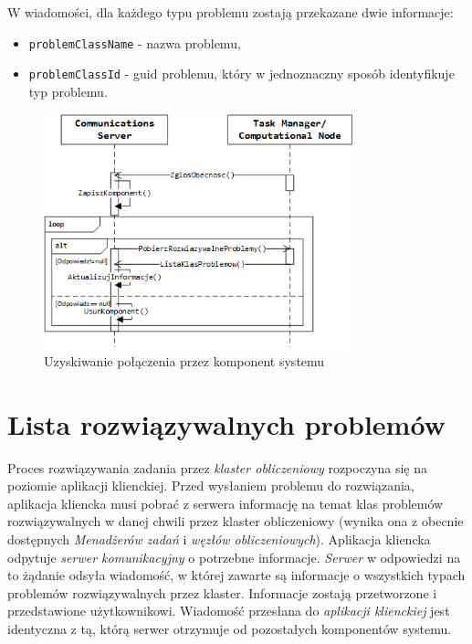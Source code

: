 \documentclass[12pt,a4paper,titlepage]{report}
\begin{document}
	W wiadomości, dla każdego typu problemu zostają przekazane dwie informacje:
	\begin{itemize}
		\item \verb+problemClassName+ - nazwa problemu,
		\item \verb+problemClassId+ - guid problemu, który w jednoznaczny sposób identyfikuje typ problemu.	
	\end{itemize} 		
		
	\begin{figure}[h]
		\centering
		\caption{Uzyskiwanie połączenia przez komponent systemu}
		\includegraphics[width=0.8\textwidth]{img/communication/connecting.png}
	\end{figure}
	
	\section{Lista rozwiązywalnych problemów}
	Proces rozwiązywania zadania przez \textit{klaster obliczeniowy} rozpoczyna się na poziomie aplikacji klienckiej. Przed
	wysłaniem problemu do rozwiązania, aplikacja kliencka musi pobrać z serwera informację na temat klas problemów
	rozwiązywalnych w danej chwili przez klaster obliczeniowy (wynika ona z obecnie dostępnych \textit{Menadżerów zadań} i
	\textit{węzłów obliczeniowych}). Aplikacja kliencka odpytuje \textit{serwer komunikacyjny} o potrzebne informacje. 
	\textit{Serwer} w odpowiedzi na to żądanie odsyła wiadomość, w której zawarte są informacje o wszystkich typach problemów
	rozwiązywalnych przez klaster. Informacje zostają przetworzone i przedstawione użytkownikowi. Wiadomość przesłana do 
	\textit{aplikacji klienckiej} jest identyczna z tą, którą serwer otrzymuje od pozostałych komponentów systemu.
	
\end{document}
